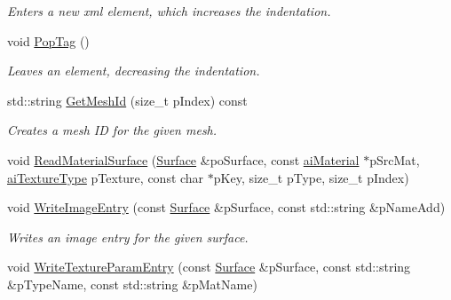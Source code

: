 \begin{DoxyCompactItemize}
\begin{DoxyCompactList}\small\item\em Enters a new xml element, which increases the indentation. \end{DoxyCompactList}\item 
\hypertarget{class_assimp_1_1_collada_exporter_a529ce1d42bc6d3b93a1d26c82eefcc6b}{void \hyperlink{class_assimp_1_1_collada_exporter_a529ce1d42bc6d3b93a1d26c82eefcc6b}{Pop\+Tag} ()}\label{class_assimp_1_1_collada_exporter_a529ce1d42bc6d3b93a1d26c82eefcc6b}

\begin{DoxyCompactList}\small\item\em Leaves an element, decreasing the indentation. \end{DoxyCompactList}\item 
\hypertarget{class_assimp_1_1_collada_exporter_af7b6b1a5735b3c7d4bc026882120cac6}{std\+::string \hyperlink{class_assimp_1_1_collada_exporter_af7b6b1a5735b3c7d4bc026882120cac6}{Get\+Mesh\+Id} (size\+\_\+t p\+Index) const }\label{class_assimp_1_1_collada_exporter_af7b6b1a5735b3c7d4bc026882120cac6}

\begin{DoxyCompactList}\small\item\em Creates a mesh I\+D for the given mesh. \end{DoxyCompactList}\item 
void \hyperlink{class_assimp_1_1_collada_exporter_a677b09a2f6e8f7823522276a38400bf7}{Read\+Material\+Surface} (\hyperlink{struct_assimp_1_1_collada_exporter_1_1_surface}{Surface} \&po\+Surface, const \hyperlink{classai_material}{ai\+Material} $\ast$p\+Src\+Mat, \hyperlink{material_8h_a7dd415ff703a2cc53d1c22ddbbd7dde0}{ai\+Texture\+Type} p\+Texture, const char $\ast$p\+Key, size\+\_\+t p\+Type, size\+\_\+t p\+Index)
\item 
\hypertarget{class_assimp_1_1_collada_exporter_ab3f4a3e0484292c301e0e6a9f7dace1c}{void \hyperlink{class_assimp_1_1_collada_exporter_ab3f4a3e0484292c301e0e6a9f7dace1c}{Write\+Image\+Entry} (const \hyperlink{struct_assimp_1_1_collada_exporter_1_1_surface}{Surface} \&p\+Surface, const std\+::string \&p\+Name\+Add)}\label{class_assimp_1_1_collada_exporter_ab3f4a3e0484292c301e0e6a9f7dace1c}

\begin{DoxyCompactList}\small\item\em Writes an image entry for the given surface. \end{DoxyCompactList}\item 
\hypertarget{class_assimp_1_1_collada_exporter_acdbfcb7cfe13afd1204c5aec9912e823}{void \hyperlink{class_assimp_1_1_collada_exporter_acdbfcb7cfe13afd1204c5aec9912e823}{Write\+Texture\+Param\+Entry} (const \hyperlink{struct_assimp_1_1_collada_exporter_1_1_surface}{Surface} \&p\+Surface, const std\+::string \&p\+Type\+Name, const std\+::string \&p\+Mat\+Name)}\label{class_assimp_1_1_collada_exporter_acdbfcb7cfe13afd1204c5aec9912e823}


\end{DoxyCompactItemize}
